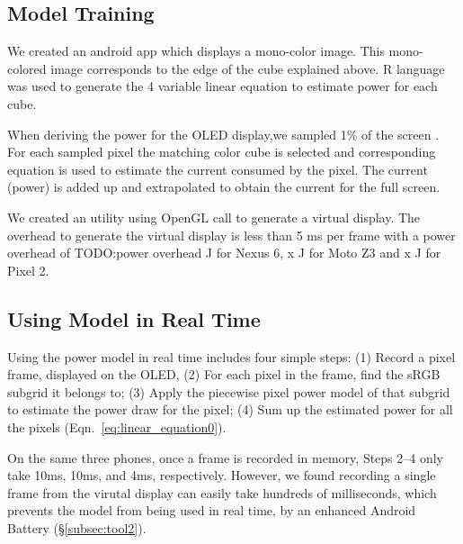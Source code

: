 
\subsection{Model Training}

We created an android app which displays a mono-color image. This mono-colored
image corresponds to the edge of the cube explained above. R language was used
to generate the 4 variable linear equation to estimate power for each cube.

When deriving the power for the OLED display,we sampled 1\%  of the screen .
For each sampled pixel the matching color cube is selected and corresponding
equation is used to estimate the current consumed by the pixel. 
The current (power) is added up and extrapolated to obtain  the current for
the full screen.

We created an utility using OpenGL call to generate a virtual display.
The overhead to generate the virtual display is less than 5 ms per frame with a
power overhead of {TODO:power overhead J for Nexus 6, x J for
Moto Z3 and x J for Pixel 2.}
\fi



\subsection{Using Model in Real Time}
\label{subsec:appl}

Using the power model in real time includes four simple steps:
(1) Record a pixel frame, \eg displayed on the OLED,
(2) For each pixel in the frame, find the sRGB subgrid it belongs to;
(3) Apply the piecewise pixel power model of that subgrid to
estimate the power draw for the pixel;
(4) Sum up the estimated power for all the pixels
(Eqn.~\ref{eq:linear_equation0}).

On the same three phones,
once a frame is recorded in memory, Steps 2--4 only take
10ms, 10ms, and 4ms, respectively.  However, we found recording a single frame from
the virutal display can easily take hundreds of milliseconds, which
prevents the model from being used in real time, \eg by an
enhanced Android Battery (\S\ref{subsec:tool2}).


